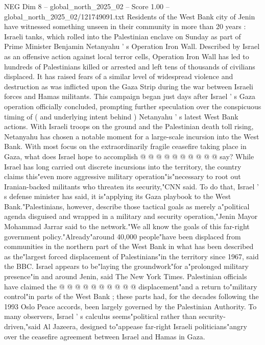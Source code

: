 \begin{textsample}{NEG Dim 8 – global\_north\_2025\_02 – Score 1.00 – global\_north\_2025\_02/121749091.txt}  \label{ex:f8_neg_434}
Residents of the West Bank city of Jenin have witnessed something unseen in their community in more than 20 years : Israeli tanks, which rolled into the Palestinian enclave on Sunday as part of Prime Minister Benjamin Netanyahu ' s Operation Iron Wall.
Described by Israel as an offensive action against local terror cells, Operation Iron Wall has led to hundreds of Palestinians killed or arrested and left tens of thousands of civilians displaced.
It has raised fears of a similar level of widespread violence and destruction as was inflicted upon the Gaza Strip during the war between Israeli forces and Hamas militants.
This campaign began just days after Israel ' s Gaza operation officially concluded, prompting further speculation over the conspicuous timing of ( and underlying intent behind ) Netanyahu ' s latest West Bank actions.
With Israeli troops on the ground and the Palestinian death toll rising, Netanyahu has chosen a notable moment for a large-scale incursion into the West Bank.
With most focus on the extraordinarily fragile ceasefire taking place in Gaza, what does Israel hope to accomplish @ @ @ @ @ @ @ @ @ @ say?
While Israel has long carried out discrete incursions into the territory, the country claims this"even more aggressive military operation"is"necessary to root out Iranian-backed militants who threaten its security,"CNN said.
To do that, Israel ' s defense minister has said, it is"applying its Gaza playbook to the West Bank."Palestinians, however, describe those tactical goals as merely a"political agenda disguised and wrapped in a military and security operation,"Jenin Mayor Mohammad Jarrar said to the network."We all know the goals of this far-right government policy."Already"around 40,000 people"have been displaced from communities in the northern part of the West Bank in what has been described as the"largest forced displacement of Palestinians"in the territory since 1967, said the BBC.
Israel appears to be"laying the groundwork"for a"prolonged military presence"in and around Jenin, said The New York Times.
Palestinian officials have claimed the @ @ @ @ @ @ @ @ @ @ displacement"and a return to"military control"in parts of the West Bank ; these parts had, for the decades following the 1993 Oslo Peace accords, been largely governed by the Palestinian Authority.
To many observers, Israel ' s calculus seems"political rather than security-driven,"said Al Jazeera, designed to"appease far-right Israeli politicians"angry over the ceasefire agreement between Israel and Hamas in Gaza.

\end{textsample}
